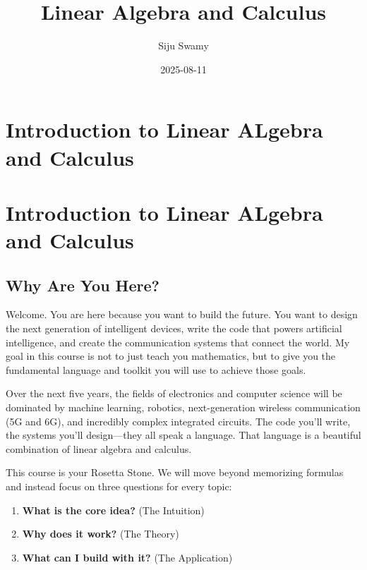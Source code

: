 \documentclass[
  letterpaper,
  DIV=11,
  numbers=noendperiod]{scrreprt}
\title{Linear Algebra and Calculus}
\author{Siju Swamy}
\date{2025-08-11}
\providecommand{\tightlist}{%
  \setlength{\itemsep}{0pt}\setlength{\parskip}{0pt}}
\renewcommand*\contentsname{Table of contents}
\newcommand\contentsname{Table of contents}
\begin{document}
\maketitle

\renewcommand*\contentsname{Table of contents}
{
\hypersetup{linkcolor=}
\setcounter{tocdepth}{2}
\tableofcontents
}


\chapter{Introduction to Linear ALgebra and
Calculus}\label{introduction-to-linear-algebra-and-calculus}


\chapter{Introduction to Linear ALgebra and
Calculus}\label{introduction-to-linear-algebra-and-calculus-1}

\section{Why Are You Here?}\label{why-are-you-here}

Welcome. You are here because you want to build the future. You want to
design the next generation of intelligent devices, write the code that
powers artificial intelligence, and create the communication systems
that connect the world. My goal in this course is not to just teach you
mathematics, but to give you the fundamental language and toolkit you
will use to achieve those goals.

Over the next five years, the fields of electronics and computer science
will be dominated by machine learning, robotics, next-generation
wireless communication (5G and 6G), and incredibly complex integrated
circuits. The code you'll write, the systems you'll design---they all
speak a language. That language is a beautiful combination of linear
algebra and calculus.

This course is your Rosetta Stone. We will move beyond memorizing
formulas and instead focus on three questions for every topic:

\begin{enumerate}
\def\labelenumi{\arabic{enumi}.}
\tightlist
\item
  \textbf{What is the core idea?} (The Intuition)
\item
  \textbf{Why does it work?} (The Theory)
\item
  \textbf{What can I build with it?} (The Application)
\end{enumerate}
\end{document}
